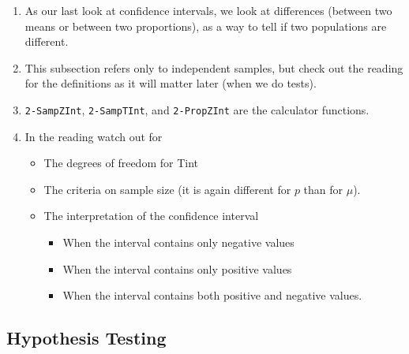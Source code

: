 \documentclass{ccg-topic}
\begin{document}
\begin{enumerate}

    \item As our last look at confidence intervals, we look at differences (between two means or between two proportions), as a way to tell if two populations are different.
    
    \item This subsection refers only to independent samples, but check out the reading for the definitions as it will matter later (when we do tests).
    
    \item \texttt{2-SampZInt}, \texttt{2-SampTInt}, and \texttt{2-PropZInt} are the calculator functions.
    
    \item In the reading watch out for
    
        \begin{itemize}
        
            \item The degrees of freedom for Tint
            
            \item The criteria on sample size (it is again different for $p$ than for $\mu$).
            
            \item The interpretation of the confidence interval
                
            \begin{itemize}
                
                \item When the interval contains only negative values
                
                \item When the interval contains only positive values
                
                \item When the interval contains both positive and negative values.
                
            \end{itemize}
            
        \end{itemize}
        
\end{enumerate}


\subsection*{Hypothesis Testing}
\end{document}
